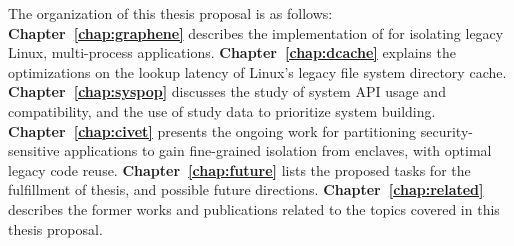 The organization of this thesis proposal is as follows:
{\bf Chapter~\ref{chap:graphene}} describes the implementation of \graphene{}\libos{} for isolating legacy Linux, multi-process applications.
{\bf Chapter~\ref{chap:dcache}} explains the optimizations on the lookup latency of
Linux's legacy file system directory cache.
{\bf Chapter~\ref{chap:syspop}} discusses the study of system API usage and compatibility,
and the use of study data to prioritize system building.
{\bf Chapter~\ref{chap:civet}} presents the ongoing work for partitioning security-sensitive
\java{} applications to gain fine-grained isolation from \intel{} \sgx{} enclaves,
with optimal legacy code reuse.
{\bf Chapter~\ref{chap:future}} lists the proposed tasks for the fulfillment of thesis,
and possible future directions.
{\bf Chapter~\ref{chap:related}} describes the former works and publications related to
the topics covered in this thesis proposal.
